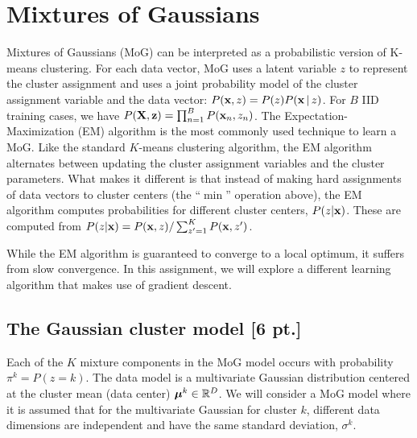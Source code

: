 \documentclass[12pt,letterpaper]{article}
\begin{document}
\section{Mixtures of Gaussians}

Mixtures of Gaussians (MoG) can be interpreted as a probabilistic version of K-means clustering. For each data vector, MoG uses a latent variable $z$ to represent the cluster assignment and uses a joint probability model of the cluster assignment variable and the data vector: $P(\bold{x}, z) = P(z)P(\bold{x} \, | \, z)$. For $B$ IID training cases, we have $P({\bold{X},\bold{z}}) = \prod_{n=1}^B P(\bold{x}_n,z_n)$. The Expectation-Maximization (EM) algorithm is the most commonly used technique to learn a MoG. Like the standard $K$-means clustering algorithm, the EM algorithm alternates between updating the cluster assignment variables and the cluster parameters. What makes it different is that instead of making hard assignments of data vectors to cluster centers (the ``$\min$'' operation above), the EM algorithm computes probabilities for different cluster centers, $P(z|\bold{x})$. These are computed from $P(z|\bold{x}) = P(\bold{x},z)/\sum_{z'=1}^K P(\bold{x},z')$.

While the EM algorithm is guaranteed to converge to a local optimum, it suffers from slow convergence. In this assignment, we will explore a different learning algorithm that makes use of gradient descent.

\subsection{The Gaussian cluster model [6 pt.]}

Each of the $K$ mixture components in the MoG model occurs with probability $\pi^k = P(z=k)$. The data model is a multivariate Gaussian distribution centered at the cluster mean (data center) $\boldsymbol{\mu}^k \in \mathbb{R}^D$. We will consider a MoG model where it is assumed that for the multivariate Gaussian for cluster $k$, different data dimensions are independent and have the same standard deviation, ${\sigma^k}$. 
\end{document}
